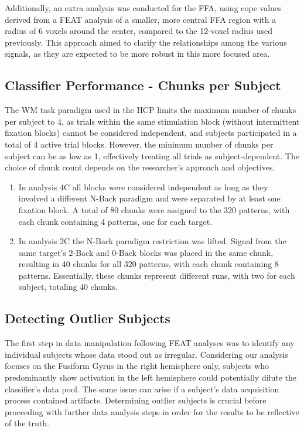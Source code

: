 Additionally, an extra analysis was conducted for the \gls{FFA}, using cope values derived from a \acrshort{FEAT} analysis of a smaller, more central \gls{FFA} region with a radius of 6 voxels around the center, compared to the 12-voxel radius used previously. This approach aimed to clarify the relationships among the various signals, as they are expected to be more robust in this more focused area.

\subsection{Classifier Performance - Chunks per Subject}
\label{subs:ch_per_subj}

The \gls{WM} task paradigm used in the \gls{HCP} limits the maximum number of chunks per subject to 4, as trials within the same stimulation block (without intermittent fixation blocks) cannot be considered independent, and subjects participated in a total of 4 active trial blocks. However, the minimum number of chunks per subject can be as low as 1, effectively treating all trials as subject-dependent. The choice of chunk count depends on the researcher's approach and objectives.

\begin{enumerate}[label=\Roman*.]

\item In analysis \gls{4C} all blocks were considered independent as long as they involved a different N-Back paradigm and were separated by at least one fixation block. A total of 80 chunks were assigned to the 320 patterns, with each chunk containing 4 patterns, one for each target.

\item In analysis \gls{2C} the N-Back paradigm restriction was lifted. Signal from the same target's 2-Back and 0-Back blocks was placed in the same chunk, resulting in 40 chunks for all 320 patterns, with each chunk containing 8 patterns. Essentially, these chunks represent different runs, with two for each subject, totaling 40 chunks.

\end{enumerate}

\subsection{Detecting Outlier Subjects}
\label{subs:outliers}

The first step in data manipulation following \gls{FEAT} analyses was to identify any individual subjects whose data stood out as irregular. Considering our analysis focuses on the Fusiform Gyrus in the right hemisphere only, subjects who predominantly show activation in the left hemisphere could potentially dilute the classifier's data pool. The same issue can arise if a subject's data acquisition process contained artifacts. Determining outlier subjects is crucial before proceeding with further data analysis steps in order for the results to be reflective of the truth.

